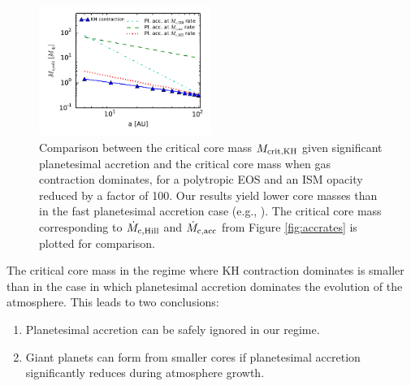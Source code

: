  \begin{figure}[h]
\centering
\includegraphics[width=0.5\textwidth]{figures/Mc_vs_a_poly_comp.pdf}
\caption{Comparison between the critical core mass $M_{\rm{crit, KH}}$ given significant planetesimal accretion and the critical core mass when gas contraction dominates, for a polytropic EOS and an ISM opacity reduced by a factor of 100. Our results yield lower core masses than in the fast planetesimal accretion case (e.g., \citealt{rafikov06}). The critical core mass corresponding to $\dot{M}_{\rm c, Hill}$ and $\dot{M}_{\rm c, acc}$ from Figure \ref{fig:accrates} is plotted for comparison.}
\label{fig:raf2}
\end{figure}

The critical core mass in the regime where KH contraction dominates is smaller than in the case in which planetesimal accretion dominates the evolution of the atmosphere. This leads to two conclusions:

\begin{enumerate}
\item Planetesimal accretion can be safely ignored in our regime.
\item Giant planets can form from smaller cores if planetesimal accretion significantly reduces during atmosphere growth. 
\end{enumerate}





